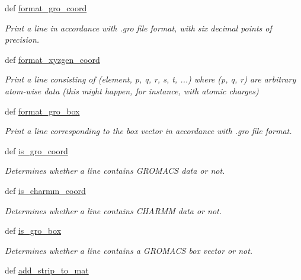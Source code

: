 \begin{DoxyCompactItemize}
def \hyperlink{namespaceforcebalance_1_1molecule_a41c13064e4285973aa6c49369d3d3390}{format\-\_\-gro\-\_\-coord}
\begin{DoxyCompactList}\small\item\em Print a line in accordance with .gro file format, with six decimal points of precision. \end{DoxyCompactList}\item 
def \hyperlink{namespaceforcebalance_1_1molecule_a4948e4662b8d2c8d515427d1bbb3d01e}{format\-\_\-xyzgen\-\_\-coord}
\begin{DoxyCompactList}\small\item\em Print a line consisting of (element, p, q, r, s, t, ...) where (p, q, r) are arbitrary atom-\/wise data (this might happen, for instance, with atomic charges) \end{DoxyCompactList}\item 
def \hyperlink{namespaceforcebalance_1_1molecule_ae25aa5331b3a2dd0e9d1e184380357db}{format\-\_\-gro\-\_\-box}
\begin{DoxyCompactList}\small\item\em Print a line corresponding to the box vector in accordance with .gro file format. \end{DoxyCompactList}\item 
def \hyperlink{namespaceforcebalance_1_1molecule_a12b7bb398c2fa49a223f258ec7737483}{is\-\_\-gro\-\_\-coord}
\begin{DoxyCompactList}\small\item\em Determines whether a line contains G\-R\-O\-M\-A\-C\-S data or not. \end{DoxyCompactList}\item 
def \hyperlink{namespaceforcebalance_1_1molecule_a838d85848bd817e801d0f5f6502217ef}{is\-\_\-charmm\-\_\-coord}
\begin{DoxyCompactList}\small\item\em Determines whether a line contains C\-H\-A\-R\-M\-M data or not. \end{DoxyCompactList}\item 
def \hyperlink{namespaceforcebalance_1_1molecule_aafc8c924eed4480fed8ddc9c474d3bc1}{is\-\_\-gro\-\_\-box}
\begin{DoxyCompactList}\small\item\em Determines whether a line contains a G\-R\-O\-M\-A\-C\-S box vector or not. \end{DoxyCompactList}\item 
def \hyperlink{namespaceforcebalance_1_1molecule_a4cdb2086978b281ed84cd66179c3f5b2}{add\-\_\-strip\-\_\-to\-\_\-mat}

\end{DoxyCompactItemize}
